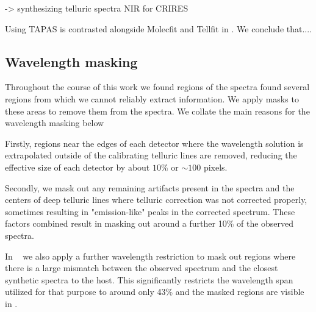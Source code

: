  -> synthesizing telluric spectra NIR for CRIRES \cite{seifahrt_synthesising_2010}


Using TAPAS is contrasted alongside Molecfit and Tellfit in \cite{ulmer-moll_telluric_2018}. We conclude that....

\subsection{Wavelength masking}
Throughout the course of this work we found regions of the spectra found several regions from which we cannot reliably extract information.
We apply masks to these areas to remove them from the spectra. We collate the main reasons for the wavelength masking below 

Firstly, regions near the edges of each detector where the wavelength solution is extrapolated outside of the calibrating telluric lines are removed, reducing the effective size of each detector by about \(10\%\) or \(\sim100\) pixels. 

Secondly, we mask out any remaining artifacts present in the spectra and the centers of deep telluric lines where telluric correction was not corrected properly, sometimes resulting in "emission-like" peaks in the corrected spectrum. These factors combined result in masking out around a further 10\% of the observed spectra. 

In ~ we also apply a further wavelength restriction to mask out regions where there is a large mismatch between the observed spectrum and the closest synthetic spectra to the host. This significantly restricts the wavelength span utilized for that purpose to around only 43\% and the masked regions are visible in . 




